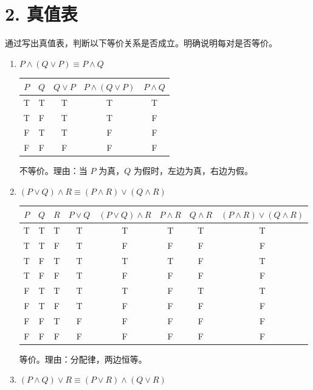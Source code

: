 \documentclass[11pt]{article}
\newenvironment{qparts}{\begin{enumerate}[{(}a{)}]}{\end{enumerate}}
\begin{document}
\section*{2. 真值表}
通过写出真值表，判断以下等价关系是否成立。明确说明每对是否等价。

\begin{qparts}
\item $P \wedge (Q \vee P) \equiv P \wedge Q$

\begin{center}
\begin{tabular}{|c|c|c|c|c|}
\hline
$P$ & $Q$ & $Q \vee P$ & $P \wedge (Q \vee P)$ & $P \wedge Q$ \\
\hline
T & T & T & T & T \\
T & F & T & T & F \\
F & T & T & F & F \\
F & F & F & F & F \\
\hline
\end{tabular}
\end{center}

不等价。理由：当 $P$ 为真，$Q$ 为假时，左边为真，右边为假。

\item $(P \vee Q) \wedge R \equiv (P \wedge R) \vee (Q \wedge R)$

\begin{center}
\begin{tabular}{|c|c|c|c|c|c|c|c|}
\hline
$P$ & $Q$ & $R$ & $P \vee Q$ & $(P \vee Q) \wedge R$ & $P \wedge R$ & $Q \wedge R$ & $(P \wedge R) \vee (Q \wedge R)$ \\
\hline
T & T & T & T & T & T & T & T \\
T & T & F & T & F & F & F & F \\
T & F & T & T & T & T & F & T \\
T & F & F & T & F & F & F & F \\
F & T & T & T & T & F & T & T \\
F & T & F & T & F & F & F & F \\
F & F & T & F & F & F & F & F \\
F & F & F & F & F & F & F & F \\
\hline
\end{tabular}
\end{center}

等价。理由：分配律，两边恒等。

\item $(P \wedge Q) \vee R \equiv (P \vee R) \wedge (Q \vee R)$


\end{qparts}
\end{document}
